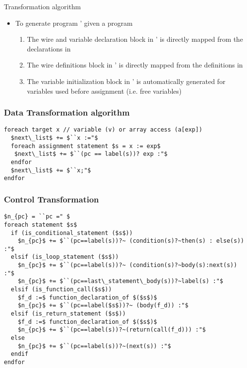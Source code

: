 \begin{frame}{Transformation algorithm}
\begin{itemize}
 \item To generate \thislanguage{} program \Pm' given a \psqlanguage{} program \Pm
 \begin{enumerate}
  \item The wire and variable declaration block in \Pm' is directly mapped from the 
  declarations in \Pm
  \item The wire definitions block in \Pm' is directly mapped from the definitions 
  in \Pm
  \item The variable initialization block in \Pm' is automatically generated
  for variables used before assignment (i.e. free variables)
 \end{enumerate}
\end{itemize}
\end{frame}

\begin{frame}[containsverbatim]
\frametitle{Data Transformation algorithm}
\begin{lstlisting}
foreach target x // variable (v) or array access (a[exp])
  $next\_list$ += $``x :="$ 
  foreach assignment statement $s = x := exp$
   $next\_list$ += $``(pc == label(s))? exp :"$ 
  endfor
  $next\_list$ += $``x;"$
endfor
\end{lstlisting}
\end{frame}

\begin{frame}[containsverbatim]
\frametitle{Control Transformation}
\begin{lstlisting}
$n_{pc} = ``pc =" $
foreach statement $s$
  if (is_conditional_statement ($s$))
    $n_{pc}$ += $``(pc==label(s))?~ (condition(s)?~then(s) : else(s)) :"$
  elsif (is_loop_statement ($s$))
    $n_{pc}$ += $``(pc==label(s))?~ (condition(s)?~body(s):next(s)) :"$ 
    $n_{pc}$ += $``(pc==last\_statement\_body(s))?~label(s) :"$
  elsif (is_function_call($s$))
    $f_d :=$ function_declaration_of $($s$)$
    $n_{pc}$ += $``(pc==label($s$))?~ (body(f_d)) :"$
  elsif (is_return_statement ($s$))
    $f_d :=$ function_declaration_of $($s$)$
    $n_{pc}$ += $``(pc==label(s))?~(return(call(f_d))) :"$
  else 
    $n_{pc}$ += $``(pc==label(s))?~(next(s)) :"$
  endif
endfor
\end{lstlisting}
\end{frame}

